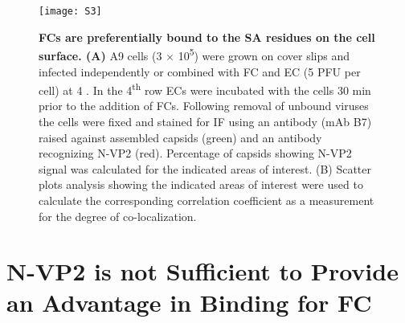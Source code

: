 \begin{figure}
\centering
  \texttt{[image: S3]}
  \caption[FCs are preferentially bound to the SA residues on the cell surface.]
   {\textbf{FCs are preferentially bound to the SA residues on the cell surface. (A)} A9 cells (3 $\times$ 10\textsuperscript{5}) were grown on cover slips and infected independently or combined with FC and EC (5 PFU per cell) at 4 \textcelsius. In the 4\textsuperscript{th} row ECs were incubated with the cells 30 min prior to the addition of FCs. Following removal of unbound viruses the cells were fixed and stained for IF using an antibody (mAb B7) raised against assembled capsids (green) and an antibody recognizing N-VP2 (red). Percentage of capsids showing N-VP2 signal was calculated for the indicated areas of interest. (B) Scatter plots analysis showing the indicated areas of interest were used to calculate the corresponding correlation coefficient as a measurement for the degree of co-localization.} 
\label{S3}
\end{figure}



\section{N-VP2 is not Sufficient to Provide an Advantage in Binding for FC}

